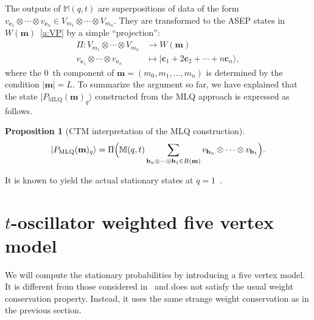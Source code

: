 \documentclass[11pt]{article}
\newtheorem{prop}[theo]{Proposition}
\theoremstyle{definition}
\numberwithin{equation}{section}
\newcommand{\ket}[1]{\lvert #1 \rangle}
\newcommand{\abs}[1]{\lvert #1 \rvert}
\newcommand{\bb}{\mathbf{b}}
\newcommand{\cc}{\mathbf{c}}
\newcommand{\mm}{\mathbf{m}}
\begin{document}
The outputs of $\mathbb{M}(q,t)$ are superpositions of data of the form $v_{\cc_1}\otimes \cdots \otimes v_{\cc_n} \in V_{m_1} \otimes \cdots \otimes V_{m_n}$.
They are transformed to the ASEP states in $W(\mm)$~\eqref{a:VP} by a simple ``projection'':
\begin{equation}\label{a:Pi}
 \begin{aligned}
 \Pi \colon V_{m_1} \otimes \cdots \otimes V_{m_n} &\rightarrow 
 W(\mm)
 \\
 v_{\cc_1} \otimes \cdots \otimes v_{\cc_n} & \mapsto
 \ket{\cc_1+2\cc_2+\cdots + n\cc_n},
 \end{aligned}
\end{equation}
where the $0$~th component of $\mm = (m_0, m_1, \ldots, m_n)$ is determined by the condition $\abs{\mm} = L$.
To summarize the argument so far, we have explained that the state 
$\ket{P_{\text{MLQ}}(\mm)_q}$ constructed from the 
MLQ approach is expressed as follows.
 
 \begin{prop}[CTM interpretation of the MLQ construction]\label{a:pr:P}
 \begin{align}
 \ket{P_{\text{MLQ}}(\mm)_q} = 
 \Pi\Bigl(
 \mathbb{M}(q,t)\sum_{\bb_n \otimes \cdots \otimes \bb_1 \in B(\mm)}
 v_{\bb_n} \otimes \cdots \otimes v_{\bb_1} 
 \Bigr).
 \end{align}
 \end{prop}
  It is known to yield the actual stationary states at $q=1$~\cite{Martin20}.

\section{\texorpdfstring{$t$}{t}-oscillator weighted five vertex model}\label{sec:5v}

We will compute the stationary probabilities by introducing a five vertex model.
It is different from those considered in~\cite{KMO1, KMO2} and 
does not satisfy the usual weight conservation property.
Instead, it uses the same strange weight conservation as in the previous section.
\end{document}
